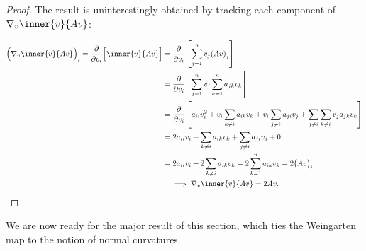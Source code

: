     \begin{proof}
        The result is uninterestingly obtained by tracking
        each component of
        $\nabla_{v} \inner{v}{Av}$:
        
        \begin{align}
        {\Big(\nabla_{v} \inner{v}{Av}\Big)}_{i} =
                \frac{\partial}{\partial v_i} \Big[
                \inner{v}{Av}\Big]
                &=  \frac{\partial}{\partial v_i} \left[
                    \sum_{j=1}^{n} v_j {(Av)}_j\right] \\
                &=	\frac{\partial}{\partial v_i} \left[
                \sum_{j=1}^{n} v_j \sum_{k=1}^n a_{jk} v_k \right] \\
                &= \frac{\partial}{\partial v_i} \left[
                a_{ii} v_i^2 + v_i \sum_{k\ne i} a_{ik} v_k
                 + v_i \sum_{j\ne i} a_{ji} v_j
                 + \sum_{j\ne i} \sum_{k \ne i} v_j a_{jk} v_k \right] \\
    &=  2 a_{ii} v_i + \sum_{k\ne i} a_{ik} v_k
    + \sum_{j\ne i} a_{ji} v_j + 0 \\
    &= 2 a_{ii} v_i + 2 \sum_{k\ne i} a_{ik} v_k
     = 2 \sum_{k=1}^n a_{ik}v_{k} = 2 {\big(Av\big)}_i \\
     &\quad \implies \nabla_{v} \inner{v}{Av} = 2Av.
        \end{align}
    \end{proof}
    
    We are now ready for the major result of this section, which ties the Weingarten map to the
    notion of normal curvatures.
    
